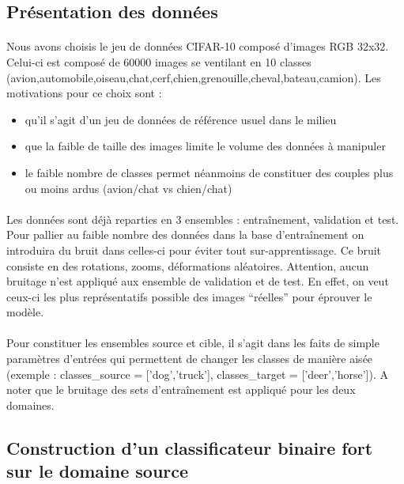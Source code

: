 \documentclass[11 pt]{article}
\begin{document}
\subsection{Présentation des données}
\paragraph{}Nous avons choisis le jeu de données CIFAR-10 composé d’images RGB 32x32. Celui-ci est composé de 60000 images se ventilant en 10 classes (avion,automobile,oiseau,chat,cerf,chien,grenouille,cheval,bateau,camion). Les motivations pour ce choix sont :\\ \medskip
\begin{itemize}
  \item qu’il s’agit d’un jeu de données de référence usuel dans le milieu
  \item que la faible de taille des images limite le volume des données à manipuler
  \item le faible nombre de classes permet néanmoins de constituer des couples plus ou moins ardus (avion/chat vs chien/chat)
\end{itemize}

\paragraph{}Les données sont déjà reparties en 3 ensembles : entraînement, validation et test. Pour pallier au faible nombre des données dans la base d’entraînement on introduira du bruit dans celles-ci pour éviter tout sur-apprentissage. Ce bruit consiste en des rotations, zooms, déformations aléatoires. Attention, aucun bruitage n’est appliqué aux ensemble de validation et de test. En effet, on veut ceux-ci les plus représentatifs possible des images “réelles” pour éprouver le modèle.

\paragraph{}Pour constituer les ensembles source et cible, il s’agit dans les faits de simple paramètres d’entrées qui permettent de changer les classes de manière aisée (exemple : classes\_source = ['dog','truck'], classes\_target = ['deer','horse']). A noter que le bruitage des sets d’entraînement est appliqué pour les deux domaines.


\subsection{Construction d'un classificateur binaire fort sur le domaine source}
\end{document}
